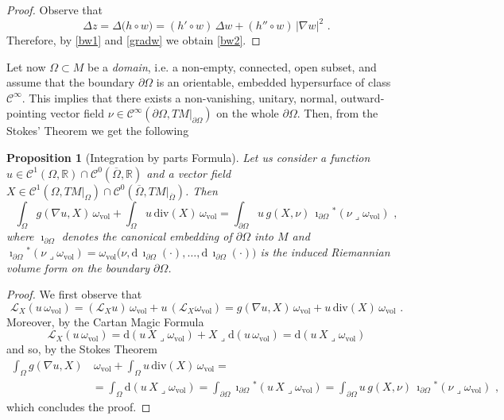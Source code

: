 \documentclass[10pt, a4paper, reqno, oneside]{amsart}
\theoremstyle{plain}
\newtheorem{prop}[theo]{Proposition}
\theoremstyle{definition}
\theoremstyle{plain}
\theoremstyle{definition}
\theoremstyle{plain}
\renewcommand{\=}{:=}
\begin{document}
\begin{proof} Observe that
$$
\Delta z = \Delta \big(h \circ w \big) = (h' {\circ} w)\, \Delta w + (h'' {\circ} w)\, |\nabla w|^2 \,\, .
$$
Therefore, by \eqref{bw1} and \eqref{gradw} we obtain \eqref{bw2}. \end{proof}

Let now $\Omega \subset M$ be a {\it domain}, i.e. a non-empty, connected, open subset, and assume that the boundary $\partial \Omega$ is an orientable, embedded hypersurface of class $\mathcal{C}^{\infty}$. This implies that there exists a non-vanishing, unitary, normal, outward-pointing vector field $\nu \in \mathcal{C}^{\infty}(\partial \Omega,TM|_{\partial \Omega})$ on the whole $\partial \Omega$. Then, from the Stokes' Theorem we get the following

\begin{prop}[Integration by parts Formula]
Let us consider a function $u \in \mathcal{C}^1(\Omega,\mathbb{R}) \cap \mathcal{C}^0(\overline{\Omega},\mathbb{R})$ and a vector field $X \in \mathcal{C}^1(\Omega,TM|_{\Omega}) \cap \mathcal{C}^0(\overline{\Omega},TM|_{\overline{\Omega}})$. Then
\begin{equation} \label{intpart}
\int_{\Omega} g(\nabla u,X) \, \omega_{\mathrm{vol}} + \int_{\Omega} u \, \mathrm{div}(X) \, \omega_{\mathrm{vol}} = \int_{\partial \Omega} u\,g(X, \nu) \, \imath_{\partial\Omega}{}^*(\nu \lrcorner \omega_{\mathrm{vol}}) \,\, ,
\end{equation}
where $\imath_{\partial\Omega}$ denotes the canonical embedding of $\partial\Omega$ into $M$ and $\imath_{\partial\Omega}{}^*(\nu \!\lrcorner \omega_{\mathrm{vol}}) = \omega_{\mathrm{vol}}\big(\nu, \mathrm{d}\,\imath_{\partial\Omega}({\cdot}),\dots,\mathrm{d}\,\imath_{\partial\Omega}({\cdot})\big)$ is the induced Riemannian volume form on the boundary $\partial\Omega$. 
\end{prop}

\begin{proof}
We first observe that
$$\mathcal{L}_X(u\,\omega_{\mathrm{vol}}) = (\mathcal{L}_Xu)\,\omega_{\mathrm{vol}} + u\,(\mathcal{L}_X\omega_{\mathrm{vol}}) = g(\nabla u, X)\,\omega_{\mathrm{vol}} +u \, \mathrm{div}(X) \, \omega_{\mathrm{vol}} \,\, .$$
Moreover, by the Cartan Magic Formula
$$\mathcal{L}_X(u\,\omega_{\mathrm{vol}}) = \mathrm{d}(u\, X\lrcorner \omega_{\mathrm{vol}}) + X\lrcorner \mathrm{d}(u\,\omega_{\mathrm{vol}}) = \mathrm{d}(u\, X\lrcorner \omega_{\mathrm{vol}})$$
and so, by the Stokes Theorem
\begin{align*}
\int_{\Omega} g(\nabla u,X) &\, \omega_{\mathrm{vol}} + \int_{\Omega} u \, \mathrm{div}(X) \, \omega_{\mathrm{vol}} = \\
&= \int_{\Omega} \mathrm{d}(u\, X\lrcorner \omega_{\mathrm{vol}}) = \int_{\partial \Omega} \imath_{\partial\Omega}{}^*(u\, X\lrcorner \omega_{\mathrm{vol}}) = \int_{\partial \Omega} u\,g(X, \nu) \, \imath_{\partial\Omega}{}^*(\nu \lrcorner \omega_{\mathrm{vol}}) \,\, ,
\end{align*}
which concludes the proof.
\end{proof}
\end{document}
